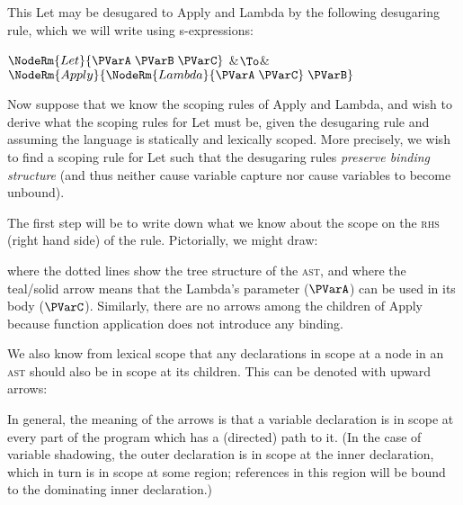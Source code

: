 This Let may be desugared to Apply and Lambda by the following desugaring rule, which
we will write using s-expressions:
\begin{LongTable}
  $\NodeRm{Let}{\PVarA\;\PVarB\;\PVarC}$
  &$\To$&
  $\NodeRm{Apply}{\NodeRm{Lambda}{\PVarA\;\PVarC}\;\PVarB}$
\end{LongTable}

Now suppose that we know the scoping rules of Apply and Lambda, and
wish to derive what the scoping rules for Let must be, given
the desugaring rule and assuming the language is statically and lexically
scoped. More precisely, we wish to find a scoping rule
for Let such that the desugaring rules \emph{preserve binding structure}
(and thus neither cause variable capture nor cause
variables to become unbound).

The first step will be to write down what we know about the
scope on the \textsc{rhs} (right hand side) of the rule.
Pictorially, we might draw:
\begin{center}
\end{center}
where the dotted lines show the tree structure of the \textsc{ast}, and
where the teal/solid arrow means that the Lambda's parameter ($\PVarA$) can be
used in its body ($\PVarC$).
Similarly, there are no arrows among the children
of Apply because function application does not introduce any binding.

We also know from lexical scope that any declarations in scope at a
node in an \textsc{ast} should also be in scope at its children. This
can be denoted with upward arrows:
\begin{center}
\end{center}
In general, the meaning of the arrows is that a variable declaration
is in scope at every part of the program which has a (directed) path to it.
(In the case of variable shadowing, the outer declaration is in scope
at the inner declaration, which in turn is in scope at some region;
references in this region will be bound to the dominating inner declaration.)

